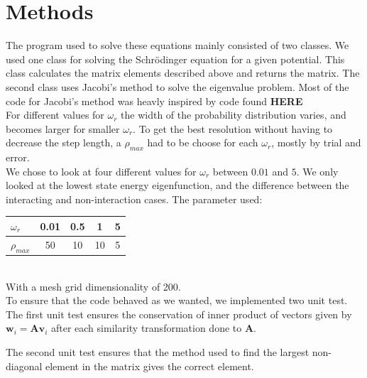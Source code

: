 \documentclass[a4paper, 10pt]{article}
\begin{document}
\section{Methods}
The program used to solve these equations mainly consisted of two classes. We used one class for solving the Schrödinger equation for a given potential. This class calculates the matrix elements described above and returns the matrix. The second class uses Jacobi's method to solve the eigenvalue problem. Most of the code for Jacobi's method was heavly inspired by code found \textbf{HERE}\\

For different values for $\omega_r$ the width of the probability distribution varies, and becomes larger for smaller $\omega_r$. To get the best resolution without having to decrease the step length, a $\rho _{max}$ had to be choose for each $\omega_r$, mostly by trial and error.\\

We chose to look at four different values for $\omega_r$ between $0.01$ and $5$. We only looked at the lowest state energy eigenfunction, and the difference between the interacting and non-interaction cases. The parameter used:\\

\begin{tabular}{|l||c|c|c|c|}
\hline
$\omega_r$ & 0.01 & 0.5 & 1 & 5 \\
\hline
$\rho_{max}$ & 50 & 10 & 10 & 5 \\
\hline
\end{tabular}\\

With a mesh grid dimensionality of 200. \\

To ensure that the code behaved as we wanted, we implemented two unit test. The first unit test ensures the conservation of inner product of vectors given by $\mathbf{w}_i = \mathbf{A}\mathbf{v}_i$ after each similarity transformation done to $\mathbf{A}$. 





The second unit test ensures that the method used to find the largest non-diagonal element in the matrix gives the correct element.


\end{document}
